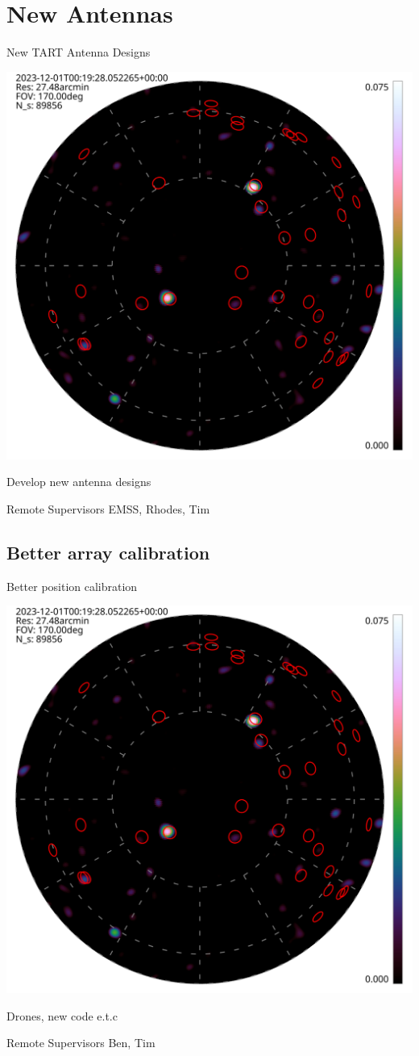 \documentclass[ignorenonframetext]{beamer}
\begin{document}
\section{New Antennas}
\begin{frame}{New TART Antenna Designs}
\begin{center}
\includegraphics[width=0.5\linewidth]{../tart_imaging/images/obs_00000.hdf.png}
 \end{center}
Develop new antenna designs
 \begin{block}{Remote Supervisors}
 EMSS, Rhodes, Tim
 \end{block}
\end{frame}


\subsection{Better array calibration}

\begin{frame}{Better position calibration}
\begin{center}
\includegraphics[width=0.5\linewidth]{../tart_imaging/images/obs_00000.hdf.png}
 \end{center}
Drones, new code e.t.c
 \begin{block}{Remote Supervisors}
 Ben, Tim
 \end{block}
\end{frame}
\end{document}
